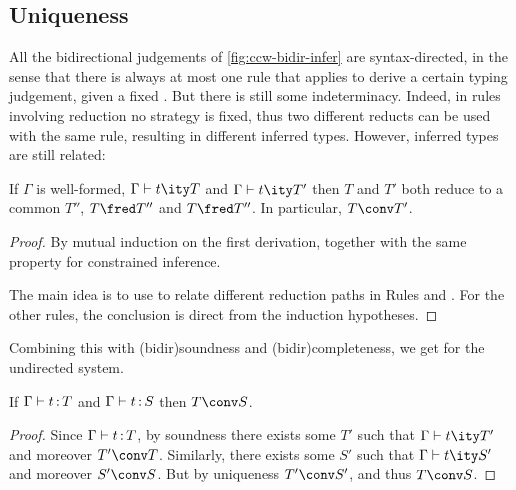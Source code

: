 \subsection{Uniqueness}

All the bidirectional judgements of \cref{fig:ccw-bidir-infer} are syntax-directed,
in the sense that there is always at most one rule that applies to derive a certain typing judgement, given a fixed .
But there is still some indeterminacy.
Indeed, in rules involving reduction no strategy is fixed, thus two different reducts can be used with the same rule, resulting in different inferred types.
However, inferred types are still related:

\begin{theorem}
  \label{thm:unique-inf}
  If $\Gamma$ is well-formed,
  $\inferty{\Gamma}{t}{T}$ and $\inferty{\Gamma}{t}{T'}$ then $T$ and $T'$ both reduce to a
  common $T''$, \eg $T \red T''$ and $T \red T''$.
  In particular, $T \conv T'$.
\end{theorem}

\begin{proof}
  By mutual induction on the first derivation, together with the same property for
  constrained inference.

  The main idea is to use  to relate different reduction paths in Rules
   and . For the other rules,
  the conclusion is direct from the induction hypotheses.
\end{proof}

Combining this with \kl(bidir){soundness} and \kl(bidir){completeness},
we get  for the undirected system.

\begin{theorem}
  \label{thm:unique-undir}
  If $\Gamma \vdash t \operatorname{\mathrel{:}} T$ and $\Gamma \vdash t \operatorname{\mathrel{:}} S$ then $T \conv S$.
\end{theorem}

\begin{minipage}{\textwidth}
\begin{proof}
  Since $\Gamma \vdash t \operatorname{\mathrel{:}} T$, by soundness
  there exists some $T'$ such that $\inferty{\Gamma}{t}{T'}$ and moreover $T' \conv T$.
  Similarly, there exists some $S'$ such that $\inferty{\Gamma}{t}{S'}$
  and moreover $S' \conv S$.
  But by uniqueness $T' \conv S'$, and thus $T \conv S$.
\end{proof}  
\end{minipage}


